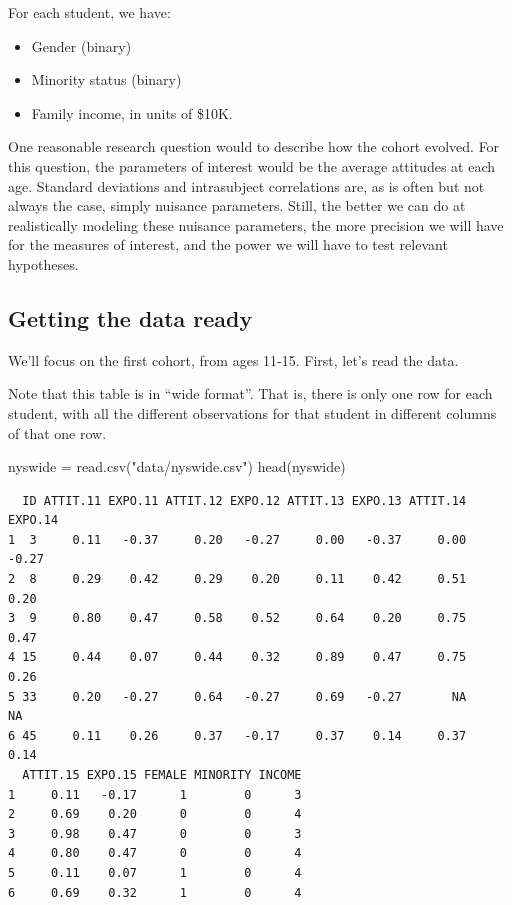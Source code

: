 \documentclass[
  letterpaper,
  DIV=11,
  numbers=noendperiod]{scrreprt}
\newenvironment{Shaded}{\begin{snugshade}}{\end{snugshade}}
\newcommand{\FunctionTok}[1]{\textcolor[rgb]{0.02,0.16,0.49}{#1}}
\newcommand{\NormalTok}[1]{\textcolor[rgb]{0.00,0.44,0.13}{#1}}
\newcommand{\OtherTok}[1]{\textcolor[rgb]{0.00,0.44,0.13}{#1}}
\newcommand{\StringTok}[1]{\textcolor[rgb]{0.25,0.44,0.63}{#1}}
\providecommand{\tightlist}{%
  \setlength{\itemsep}{0pt}\setlength{\parskip}{0pt}}\usepackage{longtable,booktabs,array}
\begin{document}
For each student, we have:

\begin{itemize}
\tightlist
\item
  Gender (binary)
\item
  Minority status (binary)
\item
  Family income, in units of \$10K.
\end{itemize}

One reasonable research question would to describe how the cohort
evolved. For this question, the parameters of interest would be the
average attitudes at each age. Standard deviations and intrasubject
correlations are, as is often but not always the case, simply nuisance
parameters. Still, the better we can do at realistically modeling these
nuisance parameters, the more precision we will have for the measures of
interest, and the power we will have to test relevant hypotheses.

\hypertarget{getting-the-data-ready-1}{%
\subsection{Getting the data ready}\label{getting-the-data-ready-1}}

We'll focus on the first cohort, from ages 11-15. First, let's read the
data.

Note that this table is in ``wide format''. That is, there is only one
row for each student, with all the different observations for that
student in different columns of that one row.

\begin{Shaded}
\begin{Highlighting}[]
\NormalTok{nyswide }\OtherTok{=} \FunctionTok{read.csv}\NormalTok{(}\StringTok{"data/nyswide.csv"}\NormalTok{)}
\FunctionTok{head}\NormalTok{(nyswide)}
\end{Highlighting}
\end{Shaded}

\begin{verbatim}
  ID ATTIT.11 EXPO.11 ATTIT.12 EXPO.12 ATTIT.13 EXPO.13 ATTIT.14 EXPO.14
1  3     0.11   -0.37     0.20   -0.27     0.00   -0.37     0.00   -0.27
2  8     0.29    0.42     0.29    0.20     0.11    0.42     0.51    0.20
3  9     0.80    0.47     0.58    0.52     0.64    0.20     0.75    0.47
4 15     0.44    0.07     0.44    0.32     0.89    0.47     0.75    0.26
5 33     0.20   -0.27     0.64   -0.27     0.69   -0.27       NA      NA
6 45     0.11    0.26     0.37   -0.17     0.37    0.14     0.37    0.14
  ATTIT.15 EXPO.15 FEMALE MINORITY INCOME
1     0.11   -0.17      1        0      3
2     0.69    0.20      0        0      4
3     0.98    0.47      0        0      3
4     0.80    0.47      0        0      4
5     0.11    0.07      1        0      4
6     0.69    0.32      1        0      4
\end{verbatim}
\end{document}
